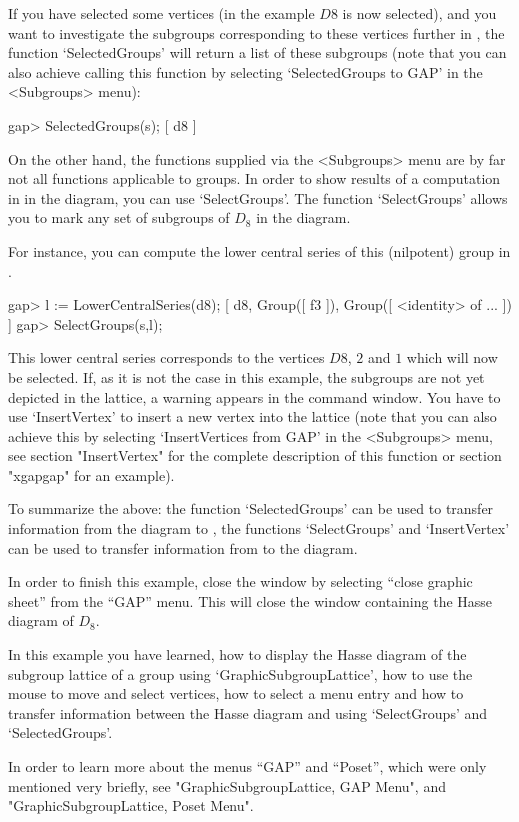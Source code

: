 If you  have  selected  some  vertices (in  the   example $D8$ is  now
selected), and you want to investigate  the subgroups corresponding to
these vertices further  in {\GAP}, the function  `SelectedGroups' will
return a list of  these  subgroups (note  that  you can also   achieve
calling this function by  selecting  `SelectedGroups to GAP' in  the
<Subgroups> menu):

\label{gapxgap}
\begintt
gap> SelectedGroups(s);
[ d8 ]
\endtt

On the other hand, the functions supplied via the <Subgroups> menu are by
far not all functions applicable to groups.  In order to show results of a
computation in {\GAP} in the diagram, you can use `SelectGroups'.  The
function `SelectGroups' allows you to mark any set of subgroups of $D_8$ in
the diagram.

For instance,  you can compute the lower central series of this (nilpotent)
group in {\GAP}.

\begintt
gap> l := LowerCentralSeries(d8);
[ d8, Group([ f3 ]), Group([ <identity> of ... ]) ]
gap> SelectGroups(s,l);
\endtt

This lower central series corresponds to the vertices $D8$, $2$ and
$1$ which will now be selected.  If, as it is not the case in this
example, the subgroups are not yet depicted in the lattice, a warning
appears in the {\GAP} command window. You have to use `InsertVertex'
to insert a new vertex into the lattice (note that you can also
achieve this by selecting `InsertVertices from GAP' in the
<Subgroups> menu, see section "InsertVertex" for the complete
description of this function or section "xgapgap" for an example).

To  summarize the above: the  function `SelectedGroups' can be used to
transfer information  from   the  diagram  to  {\GAP}, the   functions
`SelectGroups' and `InsertVertex' can  be used to transfer information
from {\GAP} to the diagram.

In order to finish this example, close the window by selecting ``close
graphic sheet'' from the ``GAP'' menu.  This will close the window
containing the Hasse diagram of $D_8$.

In this example you have learned, how to display the Hasse diagram of the
subgroup lattice of a group using `GraphicSubgroupLattice', how to use the
mouse to move and select vertices, how to select a menu entry and how to
transfer information between the Hasse diagram and {\GAP} using `SelectGroups'
and `SelectedGroups'.

In order to learn more about the menus ``GAP'' and ``Poset'', which were only
mentioned very briefly, see "GraphicSubgroupLattice, GAP Menu", and
"GraphicSubgroupLattice, Poset Menu".  

